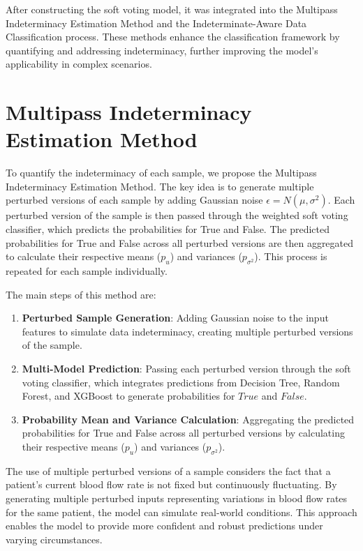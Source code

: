After constructing the soft voting model, it was integrated into the Multipass Indeterminacy Estimation Method and the Indeterminate-Aware Data Classification process. These methods enhance the classification framework by quantifying and addressing indeterminacy, further improving the model's applicability in complex scenarios.

\section{Multipass Indeterminacy Estimation Method}%
To quantify the indeterminacy of each sample, we propose the Multipass Indeterminacy Estimation Method. The key idea is to generate multiple perturbed versions of each sample by adding Gaussian noise $\epsilon=N(\mu,\sigma^2)$. Each perturbed version of the sample is then passed through the weighted soft voting classifier, which predicts the probabilities for True and False. The predicted probabilities for True and False across all perturbed versions are then aggregated to calculate their respective means ($p_{u}$) and variances ($p_{\sigma^2}$). This process is repeated for each sample individually.

The main steps of this method are:
\begin{enumerate}
  \item \textbf{Perturbed Sample Generation}: Adding Gaussian noise to the input features to simulate data indeterminacy, creating multiple perturbed versions of the sample.
  \item \textbf{Multi-Model Prediction}: Passing each perturbed version through the soft voting classifier, which integrates predictions from Decision Tree, Random Forest, and XGBoost to generate probabilities for $True$ and $False$.
  \item \textbf{Probability Mean and Variance Calculation}: Aggregating the predicted probabilities for True and False across all perturbed versions by calculating their respective means ($p_{u}$) and variances ($p_{\sigma^2}$).
\end{enumerate}

The use of multiple perturbed versions of a sample considers the fact that a patient’s current blood flow rate is not fixed but continuously fluctuating. By generating multiple perturbed inputs representing variations in blood flow rates for the same patient, the model can simulate real-world conditions. This approach enables the model to provide more confident and robust predictions under varying circumstances.


